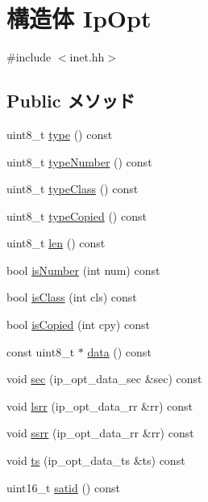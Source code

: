 \hypertarget{structNet_1_1IpOpt}{
\section{構造体 IpOpt}
\label{structNet_1_1IpOpt}
}


{\ttfamily \#include $<$inet.hh$>$}\subsection*{Public メソッド}
\begin{DoxyCompactItemize}
\item 
uint8\_\-t \hyperlink{structNet_1_1IpOpt_a7c3e8c8aa22970484617493a084000b9}{type} () const 
\item 
uint8\_\-t \hyperlink{structNet_1_1IpOpt_ab6dfc174bfa7c03b65bb47a5a95635fc}{typeNumber} () const 
\item 
uint8\_\-t \hyperlink{structNet_1_1IpOpt_af0f70ac78a76faa3fe76ccd7bf90acf5}{typeClass} () const 
\item 
uint8\_\-t \hyperlink{structNet_1_1IpOpt_a582d9edfaa08e08e2c34dc79575c42bb}{typeCopied} () const 
\item 
uint8\_\-t \hyperlink{structNet_1_1IpOpt_a157a538f6c0e591c974744259b42d8f3}{len} () const 
\item 
bool \hyperlink{structNet_1_1IpOpt_a91618c1cf25e9f87b1603e51b2a89607}{isNumber} (int num) const 
\item 
bool \hyperlink{structNet_1_1IpOpt_af8db3392ce09aa2444a45b96329091b3}{isClass} (int cls) const 
\item 
bool \hyperlink{structNet_1_1IpOpt_ae46fa46d3ed974922da4d9114fa327cc}{isCopied} (int cpy) const 
\item 
const uint8\_\-t $\ast$ \hyperlink{structNet_1_1IpOpt_a40fe50b14bf164129156972247acb8e4}{data} () const 
\item 
void \hyperlink{structNet_1_1IpOpt_afe3a37791e9a20e6780aa9a1aec92a2c}{sec} (ip\_\-opt\_\-data\_\-sec \&sec) const 
\item 
void \hyperlink{structNet_1_1IpOpt_a61ee22a35991ca04735272c593016b09}{lsrr} (ip\_\-opt\_\-data\_\-rr \&rr) const 
\item 
void \hyperlink{structNet_1_1IpOpt_a97784b42fb7ffd38b1bd1ffe8b222002}{ssrr} (ip\_\-opt\_\-data\_\-rr \&rr) const 
\item 
void \hyperlink{structNet_1_1IpOpt_ac94e6af869d0dc5da39d06906a4951ae}{ts} (ip\_\-opt\_\-data\_\-ts \&ts) const 
\item 
uint16\_\-t \hyperlink{structNet_1_1IpOpt_ae28ba2d1127ea1914b0e5f42376b47e1}{satid} () const 

\end{DoxyCompactItemize}
